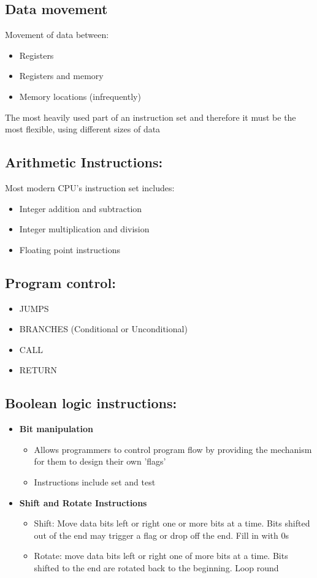 \documentclass{article}[18pt]
\begin{document}
\subsection{Data movement}
Movement of data between:
\begin{itemize}
	\item Registers
	\item Registers and memory
	\item Memory locations (infrequently)
\end{itemize}
The most heavily used part of an instruction set and therefore it must be the most flexible, using different sizes of data\\
\subsection{Arithmetic Instructions:}
Most modern CPU's instruction set includes:
\begin{itemize}
	\item Integer addition and subtraction
	\item Integer multiplication and division
	\item Floating point instructions
\end{itemize}
\subsection{Program control:}
\begin{itemize}
	\item JUMPS
	\item BRANCHES (Conditional or Unconditional)
	\item CALL
	\item RETURN
\end{itemize}
\subsection{Boolean logic instructions:}
\begin{itemize}
	\item \textbf{Bit manipulation}
	\begin{itemize}
		\item Allows programmers to control program flow by providing the mechanism for them to design their own 'flags'
		\item Instructions include set and test
	\end{itemize}
	\item \textbf{Shift and Rotate Instructions}
	\begin{itemize}
		\item Shift: Move data bits left or right one or more bits at a time. Bits shifted out of the end may trigger a flag or drop off the end. Fill in with 0s
		\item Rotate: move data bits left or right one of more bits at a time. Bits shifted to the end are rotated back to the beginning. Loop round
	\end{itemize}
\end{itemize}
\end{document}

